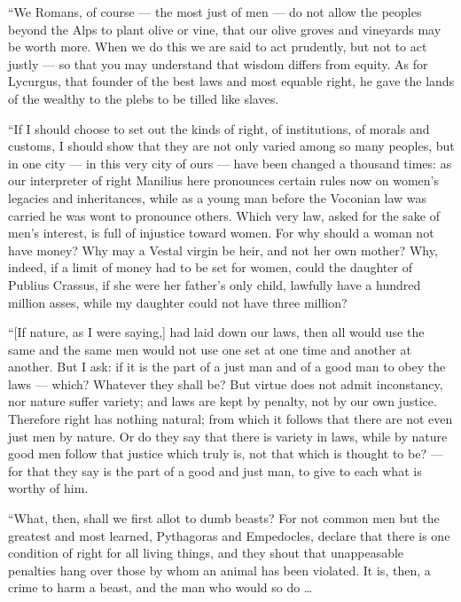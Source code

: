  ``We Romans, of course --- the most just of men --- do not allow the peoples beyond the Alps to plant olive or vine, that our olive groves and vineyards may be worth more. When we do this we are said to act prudently, but not to act justly --- so that you may understand that wisdom differs from equity. As for Lycurgus, that founder of the best laws and most equable right, he gave the lands of the wealthy to the plebs to be tilled like slaves.

 ``If I should choose to set out the kinds of right, of institutions, of morals and customs, I should show that they are not only varied among so many peoples, but in one city --- in this very city of ours --- have been changed a thousand times: as our interpreter of right Manilius here pronounces certain rules now on women's legacies and inheritances, while as a young man before the Voconian law was carried he was wont to pronounce others. Which very law, asked for the sake of men's interest, is full of injustice toward women. For why should a woman not have money? Why may a Vestal virgin be heir, and not her own mother? Why, indeed, if a limit of money had to be set for women, could the daughter of Publius Crassus, if she were her father's only child, lawfully have a hundred million asses, while my daughter could not have three million?

 ``[If nature, as I were saying,] had laid down our laws, then all would use the same and the same men would not use one set at one time and another at another. But I ask: if it is the part of a just man and of a good man to obey the laws --- which? Whatever they shall be? But virtue does not admit inconstancy, nor nature suffer variety; and laws are kept by penalty, not by our own justice. Therefore right has nothing natural; from which it follows that there are not even just men by nature. Or do they say that there is variety in laws, while by nature good men follow that justice which truly is, not that which is thought to be? --- for that they say is the part of a good and just man, to give to each what is worthy of him.

 ``What, then, shall we first allot to dumb beasts? For not common men but the greatest and most learned, Pythagoras and Empedocles, declare that there is one condition of right for all living things, and they shout that unappeasable penalties hang over those by whom an animal has been violated. It is, then, a crime to harm a beast, and the man who would so do \ldots

